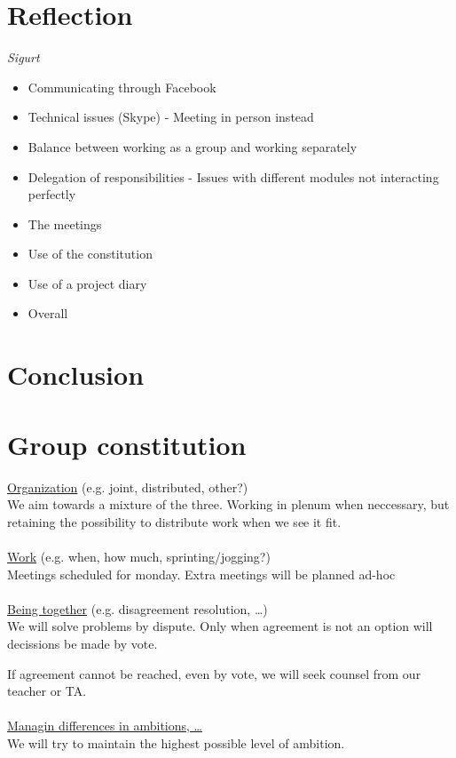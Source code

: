 \documentclass[a4paper,11pt]{article}
\begin{document}
\pagebreak
\section{Reflection}
\textsl{Sigurt}
\begin{itemize}
	\item Communicating through Facebook
	\item Technical issues (Skype) - Meeting in person instead
	\item Balance between working as a group and working separately
	\item Delegation of responsibilities - Issues with different modules not interacting perfectly
	\item The meetings
	\item Use of the constitution
	\item Use of a project diary
	\item Overall
\end{itemize}


\pagebreak
\section{Conclusion}
\label{sec:Conclusion}


\pagebreak
\appendix
\section{Group constitution}
\underline{Organization} (e.g. joint, distributed, other?) \\
We aim towards a mixture of the three. Working in plenum when neccessary, but retaining the possibility to distribute work when we see it fit. \\ \\
\underline{Work} (e.g. when, how much, sprinting/jogging?) \\
Meetings scheduled for monday.
Extra meetings will be planned ad-hoc \\ \\
\underline{Being together} (e.g. disagreement resolution, \ldots) \\
We will solve problems by dispute. Only when agreement is not an option will decissions be made by vote.

If agreement cannot be reached, even by vote, we will seek counsel from our teacher or TA. \\ \\
\underline{Managin differences in ambitions, \ldots} \\
We will try to maintain the highest possible level of ambition. \\
\end{document}
